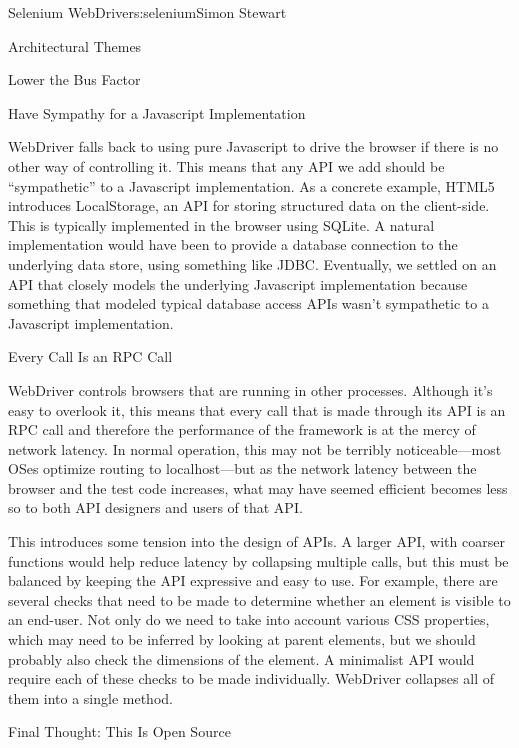 \begin{aosachapter}{Selenium WebDriver}{s:selenium}{Simon Stewart}
\begin{aosasect1}{Architectural Themes}
\begin{aosasect2}{Lower the Bus Factor}
\end{aosasect2}

\begin{aosasect2}{Have Sympathy for a Javascript Implementation}

WebDriver falls back to using pure Javascript to drive the browser if
there is no other way of controlling it. This means that any API we
add should be ``sympathetic'' to a Javascript implementation.
As a concrete example, HTML5 introduces LocalStorage, an API for
storing structured data on the client-side. This is typically
implemented in the browser using SQLite. A natural implementation
would have been to provide a database connection to the underlying
data store, using something like JDBC\@.
Eventually, we settled on an API that closely models the underlying
Javascript implementation because something that modeled typical
database access APIs wasn't sympathetic to a Javascript implementation.

\end{aosasect2}

\begin{aosasect2}{Every Call Is an RPC Call}

WebDriver controls browsers that are running in other processes. Although
it's easy to overlook it, this means that every call that is made
through its API is an RPC call and therefore the performance of the
framework is at the mercy of network latency. In normal operation,
this may not be terribly noticeable---most OSes optimize routing to
localhost---but as the network latency between the browser and the
test code increases, what may have seemed efficient becomes less so to
both API designers and users of that API.

This introduces some tension into the design of APIs. A larger API,
with coarser functions would help reduce latency by collapsing
multiple calls, but this must be balanced by keeping the API
expressive and easy to use. For example, there are several checks that
need to be made to determine whether an element is visible to an
end-user. Not only do we need to take into account various CSS
properties, which may need to be inferred by looking at parent
elements, but we should probably also check the dimensions of the
element. A minimalist API would require each of these checks to be
made individually. WebDriver collapses all of them into a single
 method.

\end{aosasect2}

\begin{aosasect2}{Final Thought: This Is Open Source}


\end{aosasect2}
\end{aosasect1}
\end{aosachapter}
